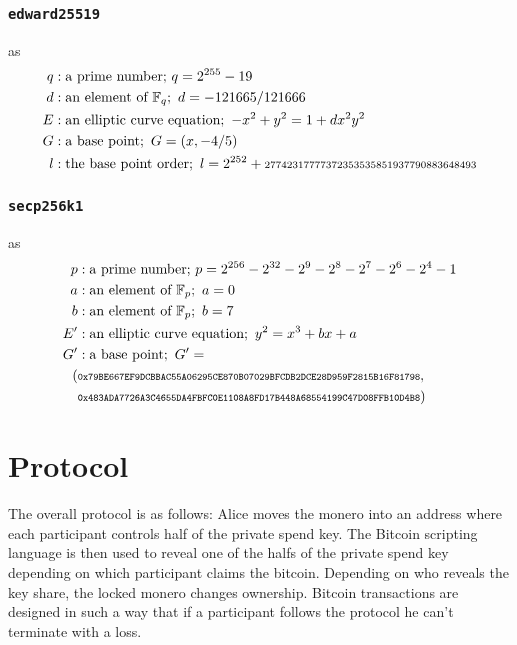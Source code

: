 \documentclass{llncs}
\begin{document}
\subsubsection{\texttt{edward25519}} as
\begin{equation}
\begin{split}
    q&: \text{a prime number;}\ q = 2^{255} - 19 \\
    d&: \text{an element of } \mathbb{F}_q;\ d = - 121665/121666 \\
    E&: \text{an elliptic curve equation};\ -x^2 + y^2 = 1 + dx^2y^2 \\
    G&: \text{a base point};\ G = (x, -4/5) \\
    l&: \text{the base point order};\ l = 2^{252} + \text{\scriptsize27742317777372353535851937790883648493} \\
\end{split}
\end{equation}

\subsubsection{\texttt{secp256k1}} as
\begin{equation}
\begin{split}
    p&: \text{a prime number;}\ p = 2^{256} - 2^{32} - 2^9 - 2^8 - 2^7 - 2^6 - 2^4 - 1 \\
    a&: \text{an element of } \mathbb{F}_p;\ a = 0 \\
    b&: \text{an element of } \mathbb{F}_p;\ b = 7 \\
    E'&: \text{an elliptic curve equation};\ y^2 = x^3 + bx + a \\
    G'&: \text{a base point};\ G' = \\ (&\texttt{\scriptsize0x79BE667EF9DCBBAC55A06295CE870B07029BFCDB2DCE28D959F2815B16F81798},\\ &\texttt{\scriptsize0x483ADA7726A3C4655DA4FBFC0E1108A8FD17B448A68554199C47D08FFB10D4B8}) \\
\end{split}
\end{equation}

\section{Protocol}

The overall protocol is as follows: Alice moves the monero into an address where each participant controls half of the private spend key. The Bitcoin scripting language is then used to reveal one of the halfs of the private spend key depending on which participant claims the bitcoin. Depending on who reveals the key share, the locked monero changes ownership. Bitcoin transactions are designed in such a way that if a participant follows the protocol he can't terminate with a loss.
\end{document}
